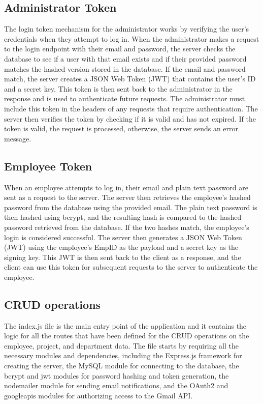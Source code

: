 \documentclass[12pt]{article}
\begin{document}
	\subsection*{Administrator Token}
	The login token mechanism for the administrator works by verifying the user's credentials when they attempt to log in. When the administrator makes a request to the login endpoint with their email and password, the server checks the database to see if a user with that email exists and if their provided password matches the hashed version stored in the database. If the email and password match, the server creates a JSON Web Token (JWT) that contains the user's ID and a secret key. This token is then sent back to the administrator in the response and is used to authenticate future requests. The administrator must include this token in the headers of any requests that require authentication. The server then verifies the token by checking if it is valid and has not expired. If the token is valid, the request is processed, otherwise, the server sends an error message.
	
	\subsection*{Employee Token}
	When an employee attempts to log in, their email and plain text password are sent as a request to the server. The server then retrieves the employee's hashed password from the database using the provided email. The plain text password is then hashed using bcrypt, and the resulting hash is compared to the hashed password retrieved from the database. If the two hashes match, the employee's login is considered successful. The server then generates a JSON Web Token (JWT) using the employee's EmpID as the payload and a secret key as the signing key. This JWT is then sent back to the client as a response, and the client can use this token for subsequent requests to the server to authenticate the employee.
	
	\subsection*{CRUD operations}
	The index.js file is the main entry point of the application and it contains the logic for all the routes that have been defined for the CRUD operations on the employee, project, and department data. The file starts by requiring all the necessary modules and dependencies, including the Express.js framework for creating the server, the MySQL module for connecting to the database, the bcrypt and jwt modules for password hashing and token generation, the nodemailer module for sending email notifications, and the OAuth2 and googleapis modules for authorizing access to the Gmail API.
	
\end{document}
